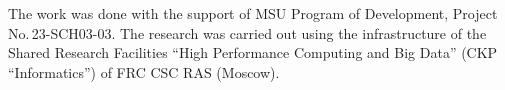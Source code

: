 



\vspace*{-12pt}


    
      \Ack

\vspace*{-3pt}

\noindent
The work was done with the support of MSU 
Program of Development, Project No.\,23-SCH03-03. The research was carried out 
using the infrastructure of the Shared Research Facilities ``High Performance 
Computing and Big Data'' (CKP ``Informatics'') of FRC CSC RAS (Moscow).


